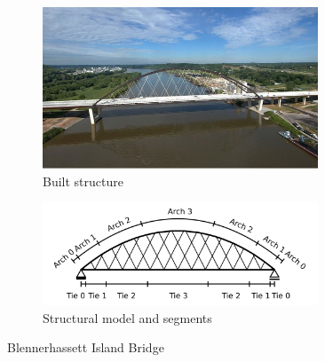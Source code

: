 \begin{figure}[H]
\centering
\begin{subfigure}{0.5\textwidth}
    \centering
    \includegraphics[width=0.9\textwidth]{overleaf/Pictures/Blennerhassett_2.jpg}
    \caption{Built structure}
    \label{fig:Blennerhassett2_a}
\end{subfigure}%
\begin{subfigure}{.5\textwidth}
    \centering
    \vspace*{0.67cm}
    \includegraphics[width=0.9\textwidth]{illustrations/figures/segments.png}
    \vspace*{0.67cm}
    \caption{Structural model and segments}
    \label{fig:Blennerhassett2_b}
\end{subfigure}
\caption{Blennerhassett Island Bridge}
\label{fig:Blennerhassett2}
\end{figure}

